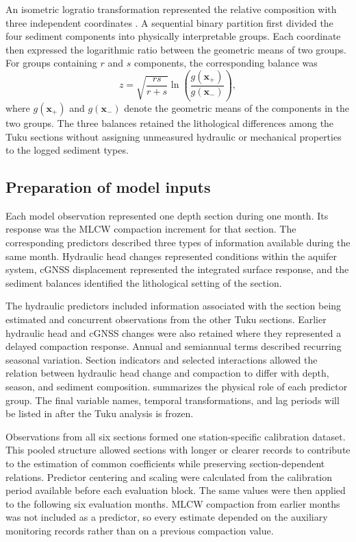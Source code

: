 An isometric logratio transformation represented the relative composition with three independent coordinates \citep{egozcue_isometric_2003, oh_using_2024}. A sequential binary partition first divided the four sediment components into physically interpretable groups. Each coordinate then expressed the logarithmic ratio between the geometric means of two groups. For groups containing $r$ and $s$ components, the corresponding balance was
\begin{equation}
z=\sqrt{\frac{rs}{r+s}}
\ln\left(\frac{g(\boldsymbol{x}_{+})}{g(\boldsymbol{x}_{-})}\right),
\label{eq:ilr_balance}
\end{equation}
where $g(\boldsymbol{x}_{+})$ and $g(\boldsymbol{x}_{-})$ denote the geometric means of the components in the two groups. The three balances retained the lithological differences among the Tuku sections without assigning unmeasured hydraulic or mechanical properties to the logged sediment types.

\subsection{Preparation of model inputs}
\label{subsec:predictor_preparation}

Each model observation represented one depth section during one month. Its response was the MLCW compaction increment for that section. The corresponding predictors described three types of information available during the same month. Hydraulic head changes represented conditions within the aquifer system, cGNSS displacement represented the integrated surface response, and the sediment balances identified the lithological setting of the section.

The hydraulic predictors included information associated with the section being estimated and concurrent observations from the other Tuku sections. Earlier hydraulic head and cGNSS changes were also retained where they represented a delayed compaction response. Annual and semiannual terms described recurring seasonal variation. Section indicators and selected interactions allowed the relation between hydraulic head change and compaction to differ with depth, season, and sediment composition.  summarizes the physical role of each predictor group. The final variable names, temporal transformations, and lag periods will be listed in  after the Tuku analysis is frozen.

Observations from all six sections formed one station-specific calibration dataset. This pooled structure allowed sections with longer or clearer records to contribute to the estimation of common coefficients while preserving section-dependent relations. Predictor centering and scaling were calculated from the calibration period available before each evaluation block. The same values were then applied to the following six evaluation months. MLCW compaction from earlier months was not included as a predictor, so every estimate depended on the auxiliary monitoring records rather than on a previous compaction value.

